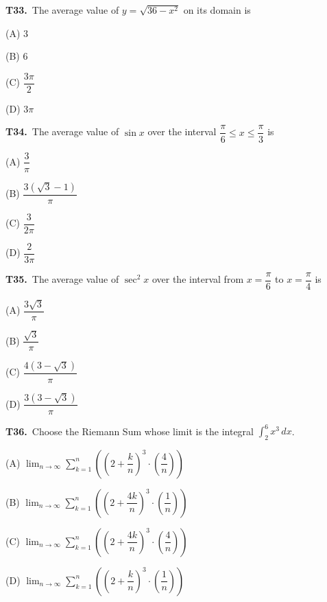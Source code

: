 \documentclass[11pt]{article}
\begin{document}
\bigskip\noindent\textbf{T33.}\ The average value of $y=\sqrt{36-x^2}$ on its domain is
\begin{list}{}{\setlength{\leftmargin}{3em}\setlength{\labelwidth}{2.5em}\setlength{\itemsep}{0pt}\setlength{\topsep}{2pt}}
\item[(A)] $3$
\item[(B)] $6$
\item[(C)] $\dfrac{3\pi}{2}$
\item[(D)] $3\pi$
\end{list}

\bigskip\noindent\textbf{T34.}\ The average value of $\sin x$ over the interval $\dfrac{\pi}{6} \leq x \leq \dfrac{\pi}{3}$ is
\begin{list}{}{\setlength{\leftmargin}{3em}\setlength{\labelwidth}{2.5em}\setlength{\itemsep}{0pt}\setlength{\topsep}{2pt}}
\item[(A)] $\dfrac{3}{\pi}$
\item[(B)] $\dfrac{3(\sqrt{3}-1)}{\pi}$
\item[(C)] $\dfrac{3}{2\pi}$
\item[(D)] $\dfrac{2}{3\pi}$
\end{list}

\bigskip\noindent\textbf{T35.}\ The average value of $\sec^2 x$ over the interval from $x=\dfrac{\pi}{6}$ to $x=\dfrac{\pi}{4}$ is
\begin{list}{}{\setlength{\leftmargin}{3em}\setlength{\labelwidth}{2.5em}\setlength{\itemsep}{0pt}\setlength{\topsep}{2pt}}
\item[(A)] $\dfrac{3\sqrt{3}}{\pi}$
\item[(B)] $\dfrac{\sqrt{3}}{\pi}$
\item[(C)] $\dfrac{4(3-\sqrt{3})}{\pi}$
\item[(D)] $\dfrac{3(3-\sqrt{3})}{\pi}$
\end{list}

\bigskip\noindent\textbf{T36.}\ Choose the Riemann Sum whose limit is the integral $\displaystyle\int_{2}^{6} x^3\,dx$.
\begin{list}{}{\setlength{\leftmargin}{3em}\setlength{\labelwidth}{2.5em}\setlength{\itemsep}{0pt}\setlength{\topsep}{2pt}}
\item[(A)] $\displaystyle\lim_{n\to\infty}\sum_{k=1}^n \left(\left(2+\dfrac{k}{n}\right)^3\cdot\left(\dfrac{4}{n}\right)\right)$
\item[(B)] $\displaystyle\lim_{n\to\infty}\sum_{k=1}^n \left(\left(2+\dfrac{4k}{n}\right)^3\cdot\left(\dfrac{1}{n}\right)\right)$
\item[(C)] $\displaystyle\lim_{n\to\infty}\sum_{k=1}^n \left(\left(2+\dfrac{4k}{n}\right)^3\cdot\left(\dfrac{4}{n}\right)\right)$
\item[(D)] $\displaystyle\lim_{n\to\infty}\sum_{k=1}^n \left(\left(2+\dfrac{k}{n}\right)^3\cdot\left(\dfrac{1}{n}\right)\right)$
\end{list}
\end{document}

